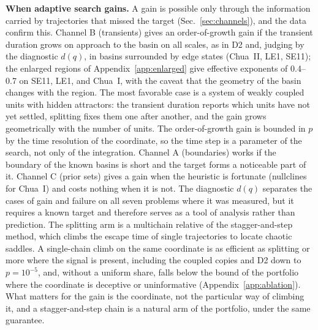 \textbf{When adaptive search gains.} A gain is possible only through the information carried by trajectories that missed the target (Sec.~\ref{sec:channels}), and the data confirm this. Channel B (transients) gives an order-of-growth gain if the transient duration grows on approach to the basin on all scales, as in D2 and, judging by the diagnostic $d(q)$, in basins surrounded by edge states (Chua~II, LE1, SE11); the enlarged regions of Appendix~\ref{app:enlarged} give effective exponents of 0.4--0.7 on SE11, LE1, and Chua~I, with the caveat that the geometry of the basin changes with the region. The most favorable case is a system of weakly coupled units with hidden attractors: the transient duration reports which units have not yet settled, splitting fixes them one after another, and the gain grows geometrically with the number of units. The order-of-growth gain is bounded in $p$ by the time resolution of the coordinate, so the time step is a parameter of the search, not only of the integration. Channel A (boundaries) works if the boundary of the known basins is short and the target forms a noticeable part of it. Channel C (prior sets) gives a gain when the heuristic is fortunate (nullclines for Chua~I) and costs nothing when it is not. The diagnostic $d(q)$ separates the cases of gain and failure on all seven problems where it was measured, but it requires a known target and therefore serves as a tool of analysis rather than prediction. The splitting arm is a multichain relative of the stagger-and-step method,\cite{SweetNusseYorke2001} which climbs the escape time of single trajectories to locate chaotic saddles. A single-chain climb on the same coordinate is as efficient as splitting or more where the signal is present, including the coupled copies and D2 down to $p=10^{-5}$, and, without a uniform share, falls below the bound of the portfolio where the coordinate is deceptive or uninformative (Appendix~\ref{app:ablation}). What matters for the gain is the coordinate, not the particular way of climbing it, and a stagger-and-step chain is a natural arm of the portfolio, under the same guarantee.


